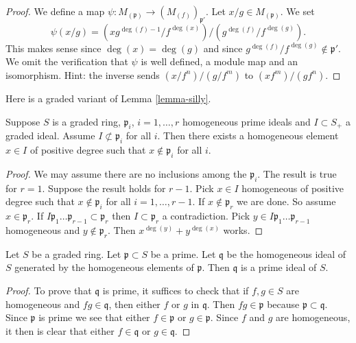 \begin{proof}
We define a map $\psi : M_{(\mathfrak p)} \to (M_{(f)})_{\mathfrak p'}$.
Let $x/g \in M_{(\mathfrak p)}$. We set
$$
\psi(x/g) = (x g^{\deg(f) - 1}/f^{\deg(x)})/(g^{\deg(f)}/f^{\deg(g)}).
$$
This makes sense since $\deg(x) = \deg(g)$ and since
$g^{\deg(f)}/f^{\deg(g)} \not \in \mathfrak p'$.
We omit the verification that $\psi$ is well defined, a module map
and an isomorphism. Hint: the inverse sends $(x/f^n)/(g/f^m)$ to
$(xf^m)/(g f^n)$.
\end{proof}

\noindent
Here is a graded variant of Lemma \ref{lemma-silly}.

\begin{lemma}
\label{lemma-graded-silly}
Suppose $S$ is a graded ring, $\mathfrak p_i$, $i = 1, \ldots, r$
homogeneous prime ideals and $I \subset S_{+}$ a graded ideal.
Assume $I \not\subset \mathfrak p_i$ for all $i$. Then there
exists a homogeneous element $x\in I$ of positive degree such
that $x\not\in \mathfrak p_i$ for all $i$.
\end{lemma}

\begin{proof}
We may assume there are no inclusions among the $\mathfrak p_i$.
The result is true for $r = 1$. Suppose the result holds for $r - 1$.
Pick $x \in I$ homogeneous of positive degree such that
$x \not \in \mathfrak p_i$ for all $i = 1, \ldots, r - 1$.
If $x \not\in \mathfrak p_r$ we are done. So assume $x \in \mathfrak p_r$.
If $I \mathfrak p_1 \ldots \mathfrak p_{r-1} \subset \mathfrak p_r$
then $I \subset \mathfrak p_r$ a contradiction.
Pick $y \in I\mathfrak p_1 \ldots \mathfrak p_{r-1}$ homogeneous
and $y \not \in \mathfrak p_r$. Then $x^{\deg(y)} + y^{\deg(x)}$ works.
\end{proof}

\begin{lemma}
\label{lemma-smear-out}
Let $S$ be a graded ring.
Let $\mathfrak p \subset S$ be a prime.
Let $\mathfrak q$ be the homogeneous ideal of $S$ generated by the
homogeneous elements of $\mathfrak p$. Then $\mathfrak q$ is a
prime ideal of $S$.
\end{lemma}

\begin{proof}
To prove that $\mathfrak q$ is prime, it suffices to check that
if $f, g \in S$ are homogeneous and $fg \in \mathfrak q$, then
either $f$ or $g$ in $\mathfrak q$. Then $fg \in \mathfrak p$
because $\mathfrak p \subset \mathfrak q$. Since $\mathfrak p$
is prime we see that either $f \in \mathfrak p$ or $g \in \mathfrak p$.
Since $f$ and $g$ are homogeneous, it then is clear that either
$f \in \mathfrak q$ or $g \in \mathfrak q$.
\end{proof}


